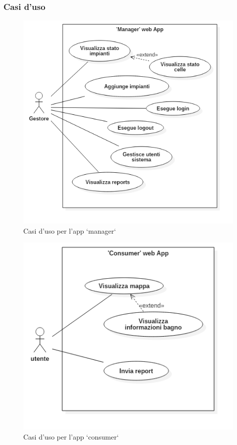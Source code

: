 \documentclass[12pt]{article}
\begin{document}
\subsubsection{Casi d'uso}

\begin{figure}[h!]
  \includegraphics[scale=0.7]{img/usecase_manager.png}
  \caption{Casi d'uso per l'app `manager`}
  \label{fig:usecase_manager}
\end{figure}
\begin{figure}[h!]
  \includegraphics[scale=0.7]{img/usecase_consumer.png}
  \caption{Casi d'uso per l'app `consumer`}
  \label{fig:usecase_consumer}
\end{figure}
\newpage
\phantom{}
\newpage
\end{document}
